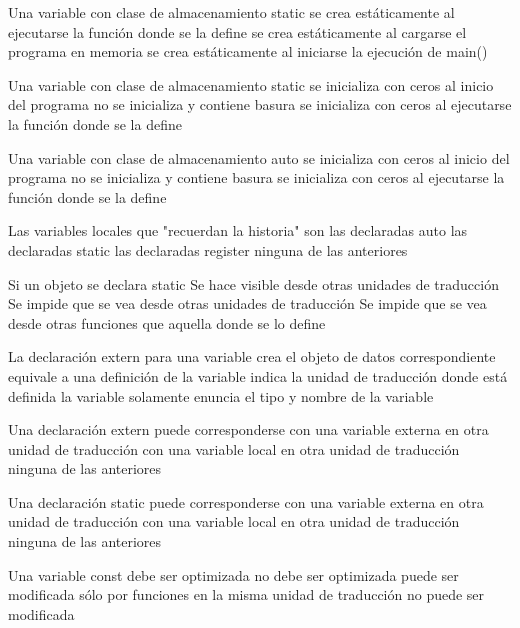 \question Una variable con clase de almacenamiento static 
\choice se crea estáticamente al ejecutarse la función donde se la define
\correctchoice se crea estáticamente al cargarse el programa en memoria
\choice se crea estáticamente al iniciarse la ejecución de main()

\question Una variable con clase de almacenamiento static 
\correctchoice se inicializa con ceros al inicio del programa
\choice no se inicializa y contiene basura
\choice se inicializa con ceros al ejecutarse la función donde se la define

\question Una variable con clase de almacenamiento auto
\choice se inicializa con ceros al inicio del programa
\correctchoice no se inicializa y contiene basura
\choice se inicializa con ceros al ejecutarse la función donde se la define

\question Las variables locales que "recuerdan la historia" son
\choice las declaradas auto
\correctchoice las declaradas static 
\choice las declaradas register
\choice ninguna de las anteriores

\question Si un objeto se declara static
\choice Se hace visible desde otras unidades de traducción
\correctchoice Se impide que se vea desde otras unidades de traducción
\choice Se impide que se vea desde otras funciones que aquella donde se lo define

\question La declaración extern para una variable
\choice crea el objeto de datos correspondiente
\choice equivale a una definición de la variable
\choice indica la unidad de traducción donde está definida la variable
\correctchoice solamente enuncia el tipo y nombre de la variable

\question Una declaración extern puede corresponderse
\correctchoice con una variable externa en otra unidad de traducción
\choice con una variable local en otra unidad de traducción
\choice ninguna de las anteriores

\question Una declaración static puede corresponderse
\choice con una variable externa en otra unidad de traducción
\choice con una variable local en otra unidad de traducción
\correctchoice ninguna de las anteriores

\question Una variable const 
\choice debe ser optimizada
\choice no debe ser optimizada
\choice puede ser modificada sólo por funciones en la misma unidad de traducción
\correctchoice no puede ser modificada
